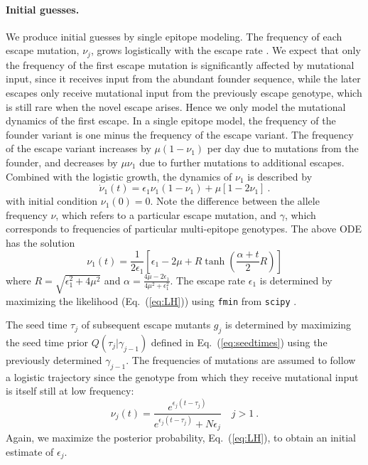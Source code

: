 \documentclass{frontiers}
\newcommand{\EQ}[1]{Eq.~(\ref{eq:#1})}
\newcommand{\gt}{g}
\newcommand{\gtfreq}{\gamma}
\newcommand{\afreq}{\nu}
\newcommand{\fcoeff}{\epsilon}
\begin{document}
\paragraph*{Initial guesses. } We produce initial guesses by single epitope
modeling. The frequency of each escape mutation, $\afreq_j$, grows logistically
with the escape rate \citep{ganusov_mathematical_2013}. We expect that only the frequency of the 
first escape mutation is significantly affected by mutational input, since it 
receives input from the abundant founder sequence, while the later escapes only 
receive mutational input from the previously escape genotype, which is still rare 
when the novel escape arises. Hence we only model the mutational dynamics of the
first escape. In a single epitope model, the frequency of the founder variant 
is one minus the frequency of the escape variant. The frequency of the escape variant
increases by $\mu (1-\nu_1)$ per day due to mutations from the founder, and decreases
by $\mu\nu_1$ due to further mutations to additional escapes. Combined with 
the logistic growth, the dynamics of  $\afreq_1$ is described by
\begin{equation}
\dot \afreq_1(t) = \fcoeff_1\afreq_1(1-\afreq_1) +\mu [1-2\afreq_1] \ .
\end{equation}
with initial condition $\afreq_1(0)=0$.
Note the difference between the allele frequency $\afreq$, which refers to a
particular escape mutation, and $\gtfreq$, which corresponds to frequencies of particular
multi-epitope genotypes. The above ODE has the solution
\begin{equation}
\afreq_1(t) = \frac{1}{2\epsilon_1}[\fcoeff_1-2\mu+R\tanh (\frac{\alpha+t}{2}R)]
\end{equation}
where $R = \sqrt{\fcoeff_1^2 + 4\mu^2}$ and $\alpha =
\frac{4\mu-2\fcoeff_1}{4\mu^2+\fcoeff_1^2}$\citep{ganusov_mathematical_2013}. 
The escape rate $\fcoeff_1$ is
determined by maximizing the likelihood (\EQ{LH}) using \texttt{fmin} from
\texttt{scipy} \citep{Oliphant:2007p25672}. 

The seed time $\tau_j$ of subsequent escape mutants $\gt_j$ is determined by
maximizing the seed time prior $Q(\tau_j|\gtfreq_{j-1})$ defined in
\EQ{seedtimes} using the previously determined $\gtfreq_{j-1}$. 
The frequencies of mutations are assumed to follow a logistic trajectory since
the genotype from which they receive mutational input is itself still at low frequency:
\begin{equation}
\afreq_j(t) =\frac{e^{\fcoeff_j(t-\tau_j)}}{e^{\fcoeff_j(t-\tau_j)} +
N\fcoeff_j} \quad j>1 \ .
\end{equation}
Again, we maximize the posterior probability, \EQ{LH}, to obtain an initial estimate of
$\fcoeff_j$.
\end{document}
